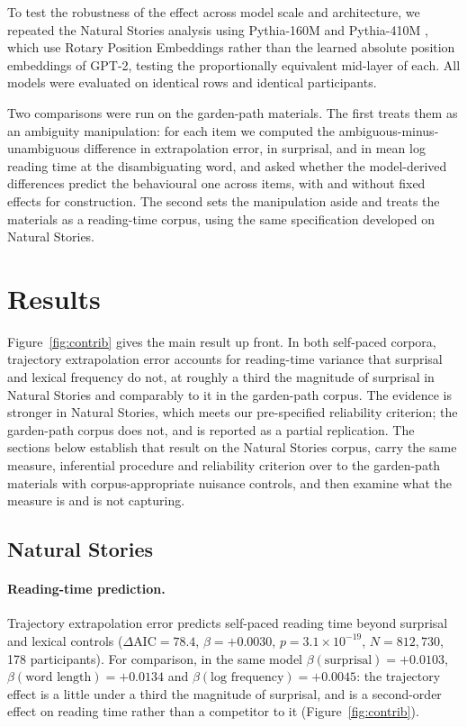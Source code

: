 \documentclass[12pt]{article}
\newcommand{\new}[1]{#1}   %
\begin{document}
\new{To test the robustness of the effect across model scale and architecture, we repeated the Natural Stories analysis using Pythia-160M and Pythia-410M \citep{biderman2023}, which use Rotary Position Embeddings rather than the learned absolute position embeddings of GPT-2, testing the proportionally equivalent mid-layer of each. All models were evaluated on identical rows and identical participants.}

\new{Two comparisons were run on the garden-path materials. The first treats them as an ambiguity manipulation: for each item we computed the ambiguous-minus-unambiguous difference in extrapolation error, in surprisal, and in mean log reading time at the disambiguating word, and asked whether the model-derived differences predict the behavioural one across items, with and without fixed effects for construction. The second sets the manipulation aside and treats the materials as a reading-time corpus, using the same specification developed on Natural Stories.}

\section{Results}

\new{Figure~\ref{fig:contrib} gives the main result up front. In both self-paced corpora, trajectory extrapolation error accounts for
reading-time variance that surprisal and lexical frequency do not, at roughly a
third the magnitude of surprisal in Natural Stories and comparably to it in the
garden-path corpus. The evidence is stronger in Natural Stories, which meets our
pre-specified reliability criterion; the garden-path corpus does not, and is
reported as a partial replication. The sections below establish that result on the Natural
Stories corpus, carry the same measure, inferential procedure and reliability
criterion over to the garden-path materials with corpus-appropriate nuisance
controls, and
then examine what the measure is and is not capturing.}

\subsection{Natural Stories}

\new{\paragraph{Reading-time prediction.} Trajectory extrapolation error predicts self-paced reading time beyond surprisal and lexical controls ($\Delta\text{AIC} = 78.4$, $\beta = +0.0030$, $p = 3.1 \times 10^{-19}$, $N = 812{,}730$, 178 participants). For comparison, in the same model $\beta(\text{surprisal}) = +0.0103$, $\beta(\text{word length}) = +0.0134$ and $\beta(\text{log frequency}) = +0.0045$: the trajectory effect is a little under a third the magnitude of surprisal, and is a second-order effect on reading time rather than a competitor to it (Figure~\ref{fig:contrib}).}
\end{document}
